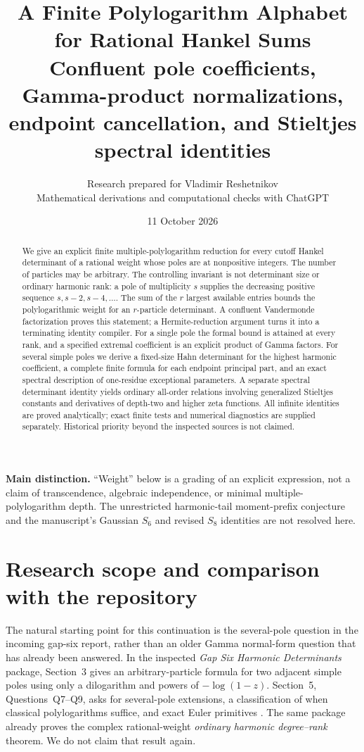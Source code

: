 \documentclass[11pt,letterpaper]{article}
\title{\textbf{A Finite Polylogarithm Alphabet\\for Rational Hankel Sums}\\[0.45em]
\large Confluent pole coefficients, Gamma-product normalizations,\\endpoint cancellation, and Stieltjes spectral identities}
\author{Research prepared for Vladimir Reshetnikov\\\small Mathematical derivations and computational checks with ChatGPT}
\date{11 October 2026}
\numberwithin{equation}{section}
\theoremstyle{definition}\newtheorem{definition}[theorem]{Definition}
\theoremstyle{remark}\newtheorem{remark}[theorem]{Remark}
\begin{document}
\maketitle
\begin{abstract}
We give an explicit finite multiple-polylogarithm reduction for every
cutoff Hankel determinant of a rational weight whose poles are at
nonpositive integers. The number of particles may be arbitrary. The
controlling invariant is not determinant size or ordinary harmonic
rank: a pole of multiplicity $s$ supplies the decreasing positive
sequence $s,s-2,s-4,\ldots$. The sum of the $r$ largest available entries
bounds the polylogarithmic weight for an $r$-particle determinant.
A confluent Vandermonde factorization proves this statement; a
Hermite-reduction argument turns it into a terminating identity compiler.
For a single pole the formal bound is attained at every rank, and a
specified extremal coefficient is an explicit product of Gamma factors.
For several simple poles we derive a fixed-size Hahn determinant for
the highest harmonic coefficient, a complete finite formula for each
endpoint principal part, and an exact spectral description of one-residue
exceptional parameters. A separate spectral determinant identity yields
ordinary all-order relations involving generalized Stieltjes constants
and derivatives of depth-two and higher zeta functions. All infinite
identities are proved analytically; exact finite tests and numerical
diagnostics are supplied separately. Historical priority beyond the
inspected sources is not claimed.
\end{abstract}
\medskip
\noindent\textbf{Main distinction.} ``Weight'' below is a grading of an
explicit expression, not a claim of transcendence, algebraic independence,
or minimal multiple-polylogarithm depth. The unrestricted harmonic-tail
moment-prefix conjecture and the manuscript's Gaussian $S_6$ and revised
$S_8$ identities are not resolved here.
\clearpage
\tableofcontents
\newpage

\section{Research scope and comparison with the repository}

The natural starting point for this continuation is the several-pole
question in the incoming gap-six report, rather than an older Gamma
normal-form question that has already been answered. In the inspected
\emph{Gap Six Harmonic Determinants} package, Section~3 gives an
arbitrary-particle formula for two adjacent simple poles using only a
dilogarithm and powers of $-\log(1-z)$. Section~5, Questions~Q7--Q9,
asks for several-pole extensions, a classification of when classical
polylogarithms suffice, and exact Euler primitives \cite{gap}.
The same package already proves the complex rational-weight
\emph{ordinary harmonic degree--rank} theorem. We do not claim that
result again.
\end{document}
